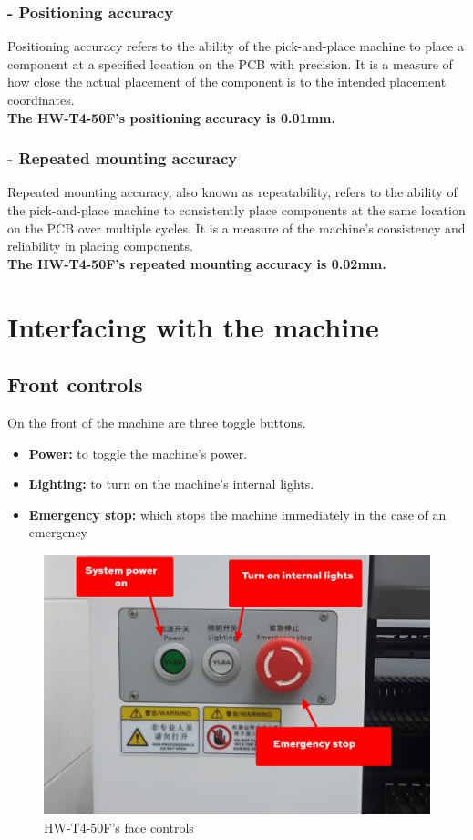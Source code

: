 \documentclass[a4paper,10pt]{report}
\begin{document}
\subsubsection{- Positioning accuracy}
Positioning accuracy refers to the ability of the pick-and-place machine to place a component at a specified location on the PCB with precision. It is a measure of how close the actual placement of the component is to the intended placement coordinates.\\ \textbf{The HW-T4-50F's positioning accuracy is 0.01mm.}
\subsubsection{- Repeated mounting accuracy}
Repeated mounting accuracy, also known as repeatability, refers to the ability of the pick-and-place machine to consistently place components at the same location on the PCB over multiple cycles. It is a measure of the machine's consistency and reliability in placing components.\\ \textbf{The HW-T4-50F's  repeated mounting accuracy is 0.02mm.}
\newpage
\section{Interfacing with the machine}
\subsection{Front controls}
On the front of the machine are three toggle buttons.
\begin{itemize}
 \item \textbf{Power: } to toggle the machine's power.
 \item \textbf{Lighting: } to turn on the machine's internal lights.
 \item \textbf{Emergency stop: } which stops the machine immediately in the case of an emergency
\end{itemize}
 \begin{figure}[!htb]
 \centering
 \includegraphics[width=1\textwidth]{images/face_panel.png}
 \caption{HW-T4-50F's face controls}
\end{figure}
\newpage
\end{document}

